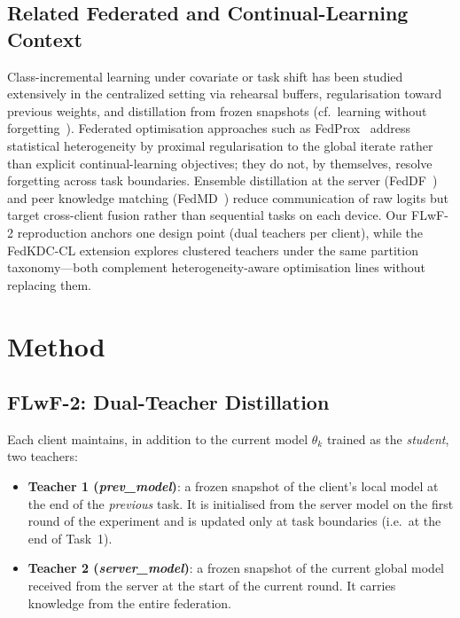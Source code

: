 \documentclass[journal]{IEEEtran}
\begin{document}
\subsection{Related Federated and Continual-Learning Context}

Class-incremental learning under covariate or task shift has been studied extensively in the centralized setting via rehearsal buffers, regularisation toward previous weights, and distillation from frozen snapshots (cf.\ learning without forgetting~\cite{lwf}). Federated optimisation approaches such as FedProx~\cite{fedprox} address statistical heterogeneity by proximal regularisation to the global iterate rather than explicit continual-learning objectives; they do not, by themselves, resolve forgetting across task boundaries. Ensemble distillation at the server (FedDF~\cite{feddf}) and peer knowledge matching (FedMD~\cite{fedmd}) reduce communication of raw logits but target cross-client fusion rather than sequential tasks on each device. Our FLwF-2 reproduction anchors one design point (dual teachers per client), while the FedKDC-CL extension explores clustered teachers under the same partition taxonomy---both complement heterogeneity-aware optimisation lines without replacing them.

\section{Method}
\label{sec:method}

\subsection{FLwF-2: Dual-Teacher Distillation}
\label{ssec:flwf2}

Each client maintains, in addition to the current model $\theta_k$
trained as the \emph{student}, two teachers:

\begin{itemize}
    \item \textbf{Teacher 1 (\emph{prev\_model})}: a frozen snapshot of
        the client's local model at the end of the \emph{previous} task.
        It is initialised from the server model on the first round of
        the experiment and is updated only at task boundaries (i.e.\ at
        the end of Task~1).
    \item \textbf{Teacher 2 (\emph{server\_model})}: a frozen snapshot
        of the current global model received from the server at the
        start of the current round. It carries knowledge from the
        entire federation.
\end{itemize}
\end{document}
